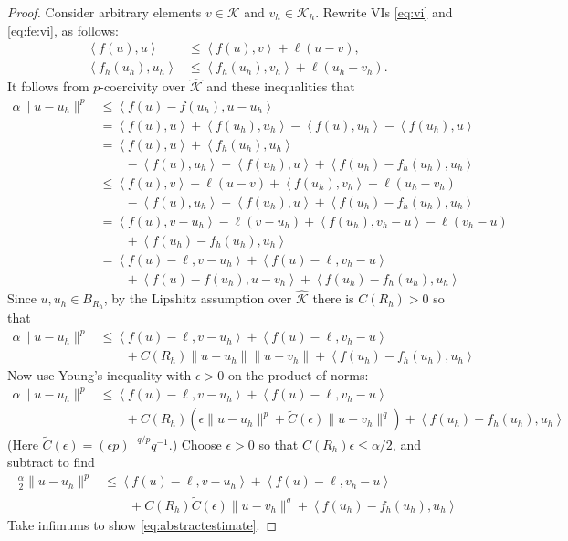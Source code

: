 \documentclass[hidelinks,onefignum,onetabnum,final]{siamart220329}  %
\newcommand{\eps}{\epsilon}
\newcommand{\cK}{\mathcal{K}}
\newcommand{\hcK}{\widehat{\cK}}
\newcommand{\ip}[2]{\left<#1,#2\right>}
\begin{document}
\begin{proof}  Consider arbitrary elements $v\in\cK$ and $v_h\in\cK_h$.  Rewrite VIs \eqref{eq:vi} and \eqref{eq:fe:vi}, as follows:
\begin{align*}
\ip{f(u)}{u}     &\le \ip{f(u)}{v} + \ell(u-v),  \\
\ip{f_h(u_h)}{u_h} &\le \ip{f_h(u_h)}{v_h} + \ell(u_h-v_h).
\end{align*}
It follows from $p$-coercivity over $\hcK$ and these inequalities that
\begin{align*}
\alpha \|u-u_h\|^p &\le \ip{f(u)-f(u_h)}{u-u_h} \\
  &= \ip{f(u)}{u} + \ip{f(u_h)}{u_h} - \ip{f(u)}{u_h} - \ip{f(u_h)}{u} \\
  &= \ip{f(u)}{u} + \ip{f_h(u_h)}{u_h} \\
  &\qquad - \ip{f(u)}{u_h} - \ip{f(u_h)}{u} + \ip{f(u_h)-f_h(u_h)}{u_h} \\
  &\le \ip{f(u)}{v} + \ell(u-v) + \ip{f(u_h)}{v_h} + \ell(u_h-v_h) \\
  &\qquad - \ip{f(u)}{u_h} - \ip{f(u_h)}{u} + \ip{f(u_h)-f_h(u_h)}{u_h} \\
  &= \ip{f(u)}{v-u_h} - \ell(v-u_h) + \ip{f(u_h)}{v_h-u} - \ell(v_h-u) \\
  &\qquad + \ip{f(u_h)-f_h(u_h)}{u_h} \\
  &= \ip{f(u)-\ell}{v-u_h} + \ip{f(u)-\ell}{v_h-u} \\
  &\qquad + \ip{f(u)-f(u_h)}{u-v_h} + \ip{f(u_h)-f_h(u_h)}{u_h}
\end{align*}
Since $u,u_h\in B_{R_h}$, by the Lipshitz assumption over $\hcK$ there is $C(R_h)>0$ so that
\begin{align*}
\alpha \|u-u_h\|^p &\le \ip{f(u)-\ell}{v-u_h} + \ip{f(u)-\ell}{v_h-u} \\
  &\qquad + C(R_h) \|u-u_h\|\|u-v_h\| + \ip{f(u_h)-f_h(u_h)}{u_h}
\end{align*}
Now use Young's inequality with $\eps>0$ \cite[Appendix B.2]{Evans2010} on the product of norms:
\begin{align*}
\alpha \|u-u_h\|^p &\le \ip{f(u)-\ell}{v-u_h} + \ip{f(u)-\ell}{v_h-u} \\
  &\qquad + C(R_h) \left(\eps\|u-u_h\|^p + \tilde C(\eps) \|u-v_h\|^q\right) + \ip{f(u_h)-f_h(u_h)}{u_h}
\end{align*}
(Here $\tilde C(\eps) = (\eps p)^{-q/p} q^{-1}$.)  Choose $\eps>0$ so that $C(R_h) \eps \le \alpha/2$, and subtract to find
\begin{align*}
\frac{\alpha}{2} \|u-u_h\|^p &\le \ip{f(u)-\ell}{v-u_h} + \ip{f(u)-\ell}{v_h-u} \\
  &\qquad + C(R_h) \tilde C(\eps) \|u-v_h\|^q + \ip{f(u_h)-f_h(u_h)}{u_h}
\end{align*}
Take infimums to show \eqref{eq:abstractestimate}.
\end{proof}
\end{document}
